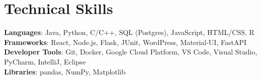 \documentclass[letterpaper,11pt]{article}
\begin{document}
%
\section{Technical Skills}
 \begin{itemize}[leftmargin=0.15in, label={}]
    \small{\item{
     \textbf{Languages}{: Java, Python, C/C++, SQL (Postgres), JavaScript, HTML/CSS, R} \\
     \textbf{Frameworks}{: React, Node.js, Flask, JUnit, WordPress, Material-UI, FastAPI} \\
     \textbf{Developer Tools}{: Git, Docker, Google Cloud Platform, VS Code, Visual Studio, PyCharm, IntelliJ, Eclipse} \\
     \textbf{Libraries}{: pandas, NumPy, Matplotlib}
    }}
 \end{itemize}


\end{document}
